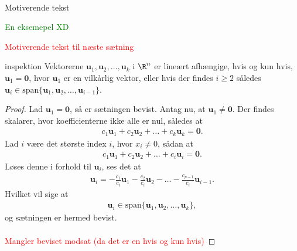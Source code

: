 %
%
\\
%
%
Motiverende tekst 
\\
%
\begin{eks}
\textcolor{green}{En eksemepel XD}
\end{eks}
%
%
\textcolor{red}{Motiverende tekst til næste sætning}
%
%
\begin{thm}{}{inspektion}
%
Vektorerne $\mathbf{u}_1,\mathbf{u}_2, \ldots ,\mathbf{u}_k$ i $\R^n$ er lineært afhængige, 
hvis og kun hvis, $\mathbf{u}_1=\mathbf{0}$, hvor $\mathbf{u}_1$ er en vilkårlig vektor, 
eller hvis der findes $i \geq 2$ således $\mathbf{u}_i \in \text{span} \{ \mathbf{u}_1,\mathbf{u}_2, \ldots ,\mathbf{u}_{i-1} \}$.
%
\end{thm}
%
%
\begin{proof}
%
Lad $\mathbf{u}_1=\mathbf{0}$, så er sætningen bevist. 
Antag nu, at $\mathbf{u}_1 \neq \mathbf{0}$. 
Der findes skalarer, hvor koefficienterne ikke alle er nul, således at
% 
\begin{align*}
c_1 \mathbf{u}_1 + c_2 \mathbf{u}_2 + \ldots + c_k \mathbf{u}_k = \mathbf{0}.
\end{align*}
%
Lad $i$ være det største index $i$, hvor $x_i \neq 0$, sådan at 
\begin{align*}
c_1 \mathbf{u}_1 + c_2 \mathbf{u}_2 + \ldots + c_i \mathbf{u}_i = \mathbf{0}.
\end{align*}
Løses denne i forhold til $\mathbf{u}_i$, ses det at
\begin{align*}
\mathbf{u}_i = - \frac{c_1}{c_i} \mathbf{u}_1 - \frac{c_2}{c_i} \mathbf{u}_2 - \ldots - \frac{c_{p-1}}{c_i} \mathbf{u}_{i-1}.
\end{align*}
Hvilket vil sige at 
\begin{align*}
\mathbf{u}_i \in \text{span}\{ \mathbf{u}_1,\mathbf{u}_2, \ldots ,\mathbf{u}_k \},
\end{align*}
%
og sætningen er hermed bevist.
%
\\\\
\textcolor{red}{Mangler beviset modsat (da det er en hvis og kun hvis)}
%
\end{proof}
\\
%
